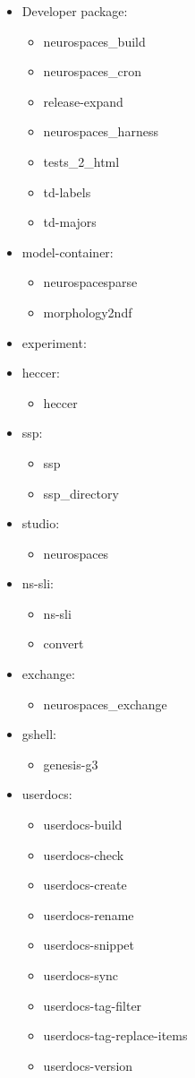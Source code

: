 \documentclass[12pt]{article}
\begin{document}
\begin{itemize}
\item Developer package:
  \begin{itemize}
  \item neurospaces\_build
  \item neurospaces\_cron
  \item release-expand
  \item neurospaces\_harness
  \item tests\_2\_html
  \item td-labels
  \item td-majors
  \end{itemize}
\item model-container:
  \begin{itemize}
  \item neurospacesparse
  \item morphology2ndf
  \end{itemize}
\item experiment:
\item heccer:
  \begin{itemize}
  \item heccer
  \end{itemize}
\item ssp:
  \begin{itemize}
  \item ssp
  \item ssp\_directory
  \end{itemize}
\item studio:
  \begin{itemize}
  \item neurospaces
  \end{itemize}
\item ns-sli:
  \begin{itemize}
  \item ns-sli
  \item convert
  \end{itemize}
\item exchange:
  \begin{itemize}
  \item neurospaces\_exchange
  \end{itemize}
\item gshell:
  \begin{itemize}
  \item genesis-g3
  \end{itemize}
\item userdocs:
  \begin{itemize}
  \item userdocs-build
  \item userdocs-check
  \item userdocs-create
  \item userdocs-rename
  \item userdocs-snippet
  \item userdocs-sync
  \item userdocs-tag-filter
  \item userdocs-tag-replace-items
  \item userdocs-version
  \end{itemize}
\end{itemize}
\end{document}
